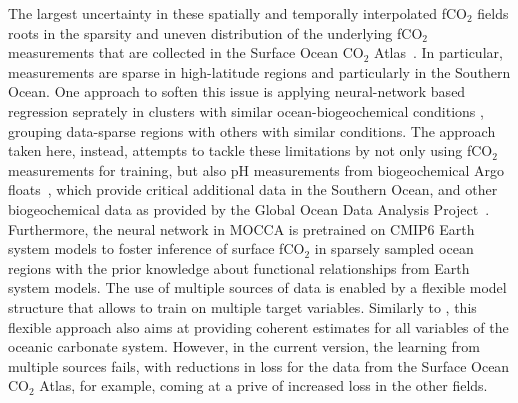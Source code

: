 \documentclass{article}
\begin{document}
	The largest uncertainty in these spatially and temporally interpolated fCO$_2$ fields roots in the sparsity and uneven distribution of the underlying fCO$_2$ measurements that are collected in the Surface Ocean CO$_2$ Atlas~\citep{bakker2016}. In particular, measurements are sparse in high-latitude regions and particularly in the Southern Ocean. One approach to soften this issue is applying neural-network based regression seprately in clusters with similar ocean-biogeochemical conditions \citep{landschuetzer2016,gregor2021}, grouping data-sparse regions with others with similar conditions. The approach taken here, instead, attempts to tackle these limitations by not only using fCO$_2$ measurements for training, but also pH measurements from biogeochemical Argo floats~\citep{johnson2017}, which provide critical additional data in the Southern Ocean, and other biogeochemical data as provided by the Global Ocean Data Analysis Project~\citep[GLODAPv2;][]{olsen2016}. Furthermore, the neural network in MOCCA is pretrained on CMIP6 Earth system models to foster inference of surface fCO$_2$ in sparsely sampled ocean regions with the prior knowledge about functional relationships from Earth system models. The use of multiple sources of data is enabled by a flexible model structure that allows to train on multiple target variables. Similarly to \cite{iida2021}, this flexible approach also aims at providing coherent estimates for all variables of the oceanic carbonate system. However, in the current version, the learning from multiple sources fails, with reductions in loss for the data from the Surface Ocean CO$_2$ Atlas, for example, coming at a prive of increased loss in the other fields.
	
\end{document}
